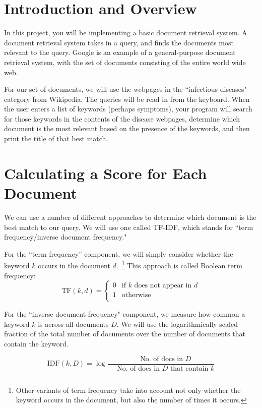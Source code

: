 \documentclass{assignment}
\begin{document}
\section*{Introduction and Overview}

In this project, you will be implementing a basic document retrieval system. A document retrieval system takes in a query, and finds the documents most relevant to the query. Google is an example of a general-purpose document retrieval system, with the set of documents consisting of the entire world wide web.

For our set of documents, we will use the webpages in the ``infectious diseases" category from Wikipedia. 
The queries will be read in from the keyboard. When the user enters a list of keywords (perhaps symptoms), your program
will search for those keywords in the contents of the disease webpages, determine which document is the most relevant
based on the presence of the keywords, and then print the title of that best match. 

\section*{Calculating a Score for Each Document}

We can use a number of different approaches to determine which document is the best match to our query. We
will use one called TF-IDF, which stands for ``term frequency/inverse document frequency." 

For the ``term frequency'' component, we will simply consider whether the keyword $k$ occurs in the document $d$.~\footnote{Other variants of term frequency take into account not only whether the keyword occurs in the document, but also the number of times it occurs.} This approach is called Boolean term frequency:
\[ \text{TF}(k, d) =
  \begin{cases}
    0       & \text{if } k \text{ does not appear in } d \\
    1       & \text{otherwise}
    \\
    \end{cases}
\]

For the ``inverse document frequency" component, we measure how common a keyword $k$ is across all documents $D$.  We will use the logarithmically scaled fraction of the total number of documents over the number of documents that contain the keyword.

\[ \text{IDF}(k, D) =
    \log \frac{ \quad \text{ No. of docs in } D }{ \quad \text{ No. of docs in } D \text{ that contain } k}\]
\end{document}
